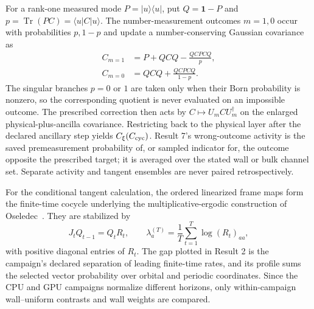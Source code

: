 \documentclass[aps,prb,twocolumn,floatfix,nofootinbib,superscriptaddress]{revtex4-2}
\newcommand{\Tr}{\operatorname{Tr}}
\begin{document}
For a rank-one measured mode $P=|u\rangle\langle u|$, put
$Q=\mathbf{1}-P$ and $p=\Tr(PC)=\langle u|C|u\rangle$.  The number-measurement outcomes
$m=1,0$ occur with probabilities $p,1-p$ and update a number-conserving Gaussian
covariance as
\begin{align}
 C_{m=1}&=P+QCQ-\frac{QCPCQ}{p},\nonumber\\
 C_{m=0}&=QCQ+\frac{QCPCQ}{1-p}.
 \label{eq:atlas-gaussian-measurement}
\end{align}
The singular branches $p=0$ or $1$ are taken only when their Born probability is
nonzero, so the corresponding quotient is never evaluated on an impossible outcome.
The prescribed correction then acts by $C\mapsto U_mCU_m^\dagger$ on the enlarged
physical-plus-ancilla covariance.  Restricting back to the physical layer after the
declared ancillary step yields $C_\xi(C_{\rm cyc})$.  Result 7's wrong-outcome activity is
the saved premeasurement probability of, or sampled indicator for, the outcome opposite
the prescribed target; it is averaged over the stated wall or bulk channel set.  Separate
activity and tangent ensembles are never paired retrospectively.

For the conditional tangent calculation, the ordered linearized frame maps form the
finite-time cocycle underlying the multiplicative-ergodic construction of
Oseledec~\cite{Oseledec1968}.  They are stabilized by
\begin{equation}
 J_tQ_{t-1}=Q_tR_t,\qquad
 \lambda_a^{(T)}=\frac1T\sum_{t=1}^{T}\log(R_t)_{aa},
 \label{eq:atlas-tangent-qr}
\end{equation}
with positive diagonal entries of $R_t$.  The gap plotted in Result 2 is the campaign's
declared separation of leading finite-time rates, and its profile sums the selected
vector probability over orbital and periodic coordinates.  Since the CPU and GPU
campaigns normalize different horizons, only within-campaign wall--uniform contrasts and
wall weights are compared.
\end{document}
